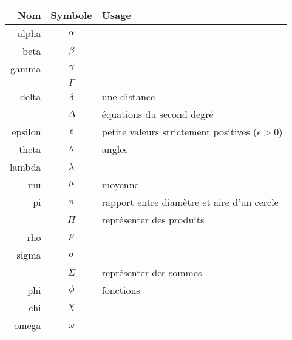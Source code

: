 \begin{longtable}{rcl}
	\toprule
	\textbf{Nom} & \textbf{Symbole} & \textbf{Usage} \\ \midrule
	alpha & $\alpha$ & \\
	beta & $\beta$ & \\
	gamma & $\gamma$& \\
	& $\Gamma$ & \\
	delta & $\delta$ & une distance \\
	& $\Delta$ & équations du second degré \\
	epsilon & $\epsilon$ & petite valeurs strictement positives ($\epsilon>0$) \\
	theta & $\theta$ & angles \\
	lambda & $\lambda$ & \\
	mu & $\mu$ & moyenne \\
	pi & $\pi$ & rapport entre diamètre et aire d'un cercle\\
	& $\Pi$ & représenter des produits \\
	rho & $\rho$ & \\
	sigma & $\sigma$ & \\
	& $\Sigma$ & représenter des sommes \\
	phi & $\phi$ & fonctions \\
	chi & $\chi$ & \\
	omega & $\omega$ & \\ \bottomrule
\end{longtable}

